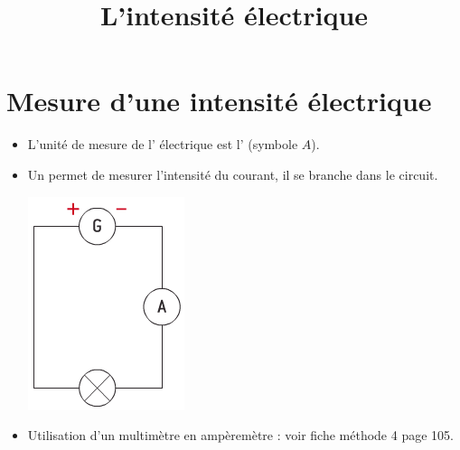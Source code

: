 \documentclass[xcolor={dvipsnames}]{beamer}
\title{L'intensité électrique}
\begin{document}
\begin{frame}
  \titlepage 
\end{frame}

\section{Mesure d'une intensité électrique}



%
%			
%			
%			



\begin{frame}

\begin{alertblock}{}
	
	\begin{itemize}
		\item L'unité de mesure de l' électrique est l'  (symbole $A$). \pause
		
		\item Un  permet de mesurer l'intensité du courant, il se branche  dans le circuit.\pause
		
		\begin{center}
			\includegraphics[scale=0.5]{../img/schema1}
		\end{center}\pause
	
		\item Utilisation d'un multimètre en ampèremètre : voir fiche méthode 4 page 105.
	\end{itemize}
	
	

\end{alertblock}
\end{frame}
\end{document}
